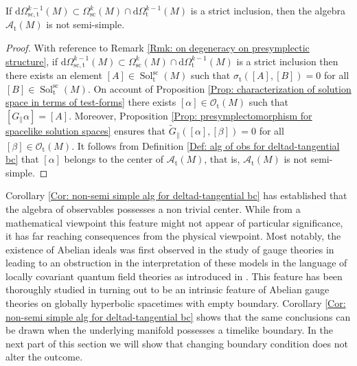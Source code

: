 \begin{corollary}\label{Cor: non-semi simple alg for deltad-tangential bc}
	If $\mathrm{d}\Omega_{\mathrm{sc,t}}^{k-1}(M)\subset\Omega_{\mathrm{sc}}^k(M)\cap\mathrm{d}\Omega_{\mathrm{t}}^{k-1}(M)$ is a strict inclusion, then the algebra $\mathcal{A}_{\mathrm{t}}(M)$ is not semi-simple.
\end{corollary}
\begin{proof}
	With reference to Remark \ref{Rmk: on degeneracy on presymplectic structure}, if $\mathrm{d}\Omega_{\mathrm{sc,t}}^{k-1}(M)\subset\Omega_{\mathrm{sc}}^k(M)\cap\mathrm{d}\Omega_{\mathrm{t}}^{k-1}(M)$ is a strict inclusion then there exists an element $[A]\in\operatorname{Sol}_{\mathrm{t}}^{\mathrm{sc}}(M)$ such that $\sigma_{\mathrm{t}}([A],[B])=0$ for all $[B]\in\operatorname{Sol}_{\mathrm{t}}^{\mathrm{sc}}(M)$.
	On account of Proposition \ref{Prop: characterization of solution space in terms of test-forms} there exists $[\alpha]\in\mathcal{O}_{\mathrm{t}}(M)$ such that $[G_\parallel\alpha]=[A]$.
	Moreover, Proposition \ref{Prop: presymplectomorphism for spacelike solution spaces} ensures that $\widetilde{G}_\parallel([\alpha],[\beta])=0$ for all $[\beta]\in\mathcal{O}_{\mathrm{t}}(M)$.
	It follows from Definition \ref{Def: alg of obs for deltad-tangential bc} that $[\alpha]$ belongs to the center of $\mathcal{A}_{\mathrm{t}}(M)$, that is, $\mathcal{A}_{\mathrm{t}}(M)$ is not semi-simple.
\end{proof}

\begin{remark}
	Corollary \ref{Cor: non-semi simple alg for deltad-tangential bc} has established that the algebra of observables possesses a non trivial center. While from a mathematical viewpoint this feature might not appear of particular significance, it has far reaching consequences from the physical viewpoint. Most notably, the existence of Abelian ideals was first observed in the study of gauge theories in \cite{dappiaggi2012quantization} leading to an obstruction in the interpretation of these models in the language of locally covariant quantum field theories as introduced in \cite{Brunetti-Fredenhagen-Verch-03}. This feature has been thoroughly studied in \cite{Benini-Dappiaggi-Hack-Schenkel-14,Benini:2013tra,Dappiaggi-Hack-Sanders-14} turning out to be an intrinsic feature of Abelian gauge theories on globally hyperbolic spacetimes with empty boundary. Corollary \ref{Cor: non-semi simple alg for deltad-tangential bc} shows that the same conclusions can be drawn when the underlying manifold possesses a timelike boundary. In the next part of this section we will show that changing boundary condition does not alter the outcome.
\end{remark}

